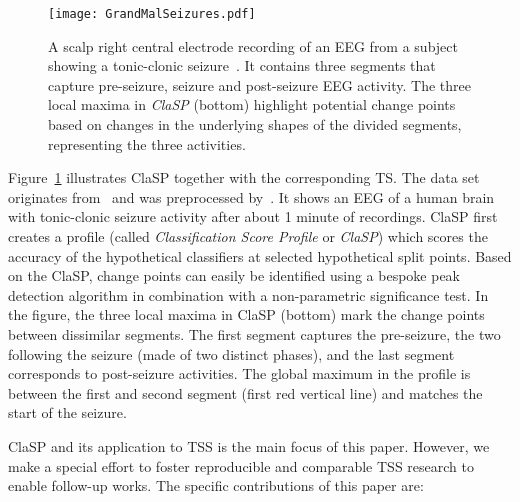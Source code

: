 \documentclass[pdflatex,sn-basic]{sn-jnl}
\begin{document}
\begin{figure}[t]
	\texttt{[image: GrandMalSeizures.pdf]}
	\caption{A scalp right central electrode recording of an EEG from a subject showing a tonic-clonic seizure~\citep{quiroga1997searching}. It contains three segments that capture pre-seizure, seizure and post-seizure EEG activity.
	The three local maxima in \emph{ClaSP} (bottom) highlight potential change points based on changes in the underlying shapes of the divided segments, representing the three activities.\label{fig:ClaSP}
	}
\end{figure}

Figure~\ref{fig:ClaSP} illustrates ClaSP together with the corresponding TS. The data set originates from~\citep{quiroga1997searching} and was preprocessed by~\citep{gharghabi2017matrix}. It shows an EEG of a human brain with tonic-clonic seizure activity after about 1 minute of recordings. ClaSP first creates a profile (called \emph{Classification Score Profile} or \emph{ClaSP}) which scores the accuracy of the hypothetical classifiers at selected hypothetical split points. Based on the ClaSP, change points can easily be identified using a bespoke peak detection algorithm in combination with a non-parametric significance test. In the figure, the three local maxima in ClaSP (bottom) mark the change points between dissimilar segments. The first segment captures the pre-seizure, the two following the seizure (made of two distinct phases), and the last segment corresponds to post-seizure activities. The global maximum in the profile is between the first and second segment (first red vertical line) and matches the start of the seizure. 

ClaSP and its application to TSS is the main focus of this paper. However, we make a special effort to foster reproducible and comparable TSS research to enable follow-up works. The specific contributions of this paper are:
\end{document}

